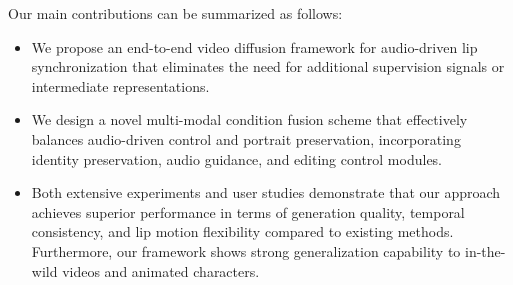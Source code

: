 Our main contributions can be summarized as follows:
\begin{itemize}
   \item We propose an end-to-end video diffusion framework for audio-driven lip synchronization that eliminates the need for additional supervision signals or intermediate representations.
   
   \item We design a novel multi-modal condition fusion scheme that effectively balances audio-driven control and portrait preservation, incorporating identity preservation, audio guidance, and editing control modules.
   
   \item Both extensive experiments and user studies demonstrate that our approach achieves superior performance in terms of generation quality, temporal consistency, and lip motion flexibility compared to existing methods. Furthermore, our framework shows strong generalization capability to in-the-wild videos and animated characters.
\end{itemize}
